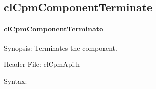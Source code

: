 {\subsection{clCpmComponentTerminate}
\hypertarget{pagecpm126}{}\paragraph{cl\-Cpm\-Component\-Terminate}\label{pagecpm126}
\begin{Desc}
\item[Synopsis:]Terminates the component.\end{Desc}
\begin{Desc}
\item[Header File:]clCpmApi.h\end{Desc}
\begin{Desc}
\item[Syntax:]


\end{Desc}}
